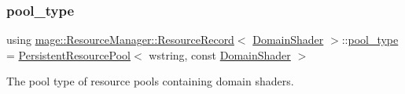 \subsubsection{\texorpdfstring{pool\+\_\+type}{pool\_type}}
{\footnotesize\ttfamily using \hyperlink{structmage_1_1_resource_manager_1_1_resource_record}{mage\+::\+Resource\+Manager\+::\+Resource\+Record}$<$ \hyperlink{namespacemage_aef8cda73e2387cb89baa6c54a7fea542}{Domain\+Shader} $>$\+::\hyperlink{structmage_1_1_resource_manager_1_1_resource_record_3_01_domain_shader_01_4_a78612efb53dce63bf8d8b33e6b9c1207}{pool\+\_\+type} =  \hyperlink{classmage_1_1_persistent_resource_pool}{Persistent\+Resource\+Pool}$<$ wstring, const \hyperlink{namespacemage_aef8cda73e2387cb89baa6c54a7fea542}{Domain\+Shader} $>$}

The pool type of resource pools containing domain shaders. 